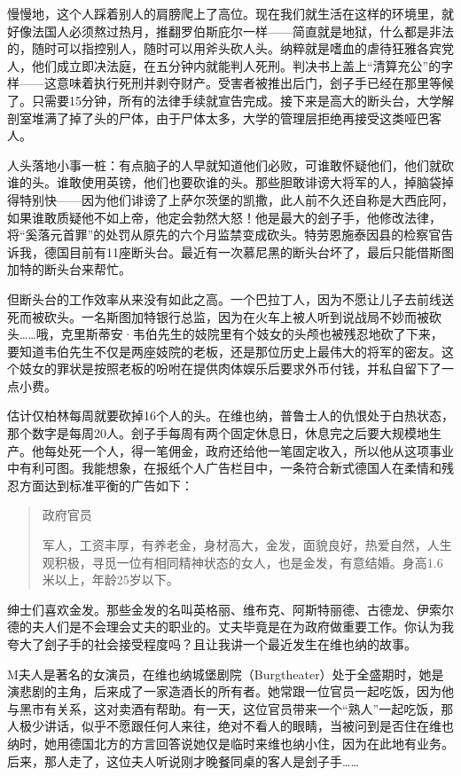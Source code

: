 \documentclass[UTF8]{ctexart}
\begin{document}
慢慢地，这个人踩着别人的肩膀爬上了高位。现在我们就生活在这样的环境里，就好像法国人必须熬过热月，推翻罗伯斯庇尔一样——简直就是地狱，什么都是非法的，随时可以指控别人，随时可以用斧头砍人头。纳粹就是嗜血的虐待狂雅各宾党人，他们成立即决法庭，在五分钟内就能判人死刑。判决书上盖上“清算充公”的字样——这意味着执行死刑并剥夺财产。受害者被推出后门，刽子手已经在那里等候了。只需要15分钟，所有的法律手续就宣告完成。接下来是高大的断头台，大学解剖室堆满了掉了头的尸体，由于尸体太多，大学的管理层拒绝再接受这类哑巴客人。

人头落地小事一桩：有点脑子的人早就知道他们必败，可谁敢怀疑他们，他们就砍谁的头。谁敢使用英镑，他们也要砍谁的头。那些胆敢诽谤大将军的人，掉脑袋掉得特别快——因为他们诽谤了上萨尔茨堡的凯撒，此人前不久还自称是大西庇阿，如果谁敢质疑他不如上帝，他定会勃然大怒！他是最大的刽子手，他修改法律，将“奚落元首罪”的处罚从原先的六个月监禁变成砍头。特劳恩施泰因县的检察官告诉我，德国目前有11座断头台。最近有一次慕尼黑的断头台坏了，最后只能借斯图加特的断头台来帮忙。

但断头台的工作效率从来没有如此之高。一个巴拉丁人，因为不愿让儿子去前线送死而被砍头。一名斯图加特银行总监，因为在火车上被人听到说战局不妙而被砍头……哦，克里斯蒂安·韦伯先生的妓院里有个妓女的头颅也被残忍地砍了下来，要知道韦伯先生不仅是两座妓院的老板，还是那位历史上最伟大的将军的密友。这个妓女的罪状是按照老板的吩咐在提供肉体娱乐后要求外币付钱，并私自留下了一点小费。

估计仅柏林每周就要砍掉16个人的头。在维也纳，普鲁士人的仇恨处于白热状态，那个数字是每周20人。刽子手每周有两个固定休息日，休息完之后要大规模地生产。他每处死一个人，得一笔佣金，政府还给他一笔固定收入，所以他从这项事业中有利可图。我能想象，在报纸个人广告栏目中，一条符合新式德国人在柔情和残忍方面达到标准平衡的广告如下：

\begin{quote}
政府官员

军人，工资丰厚，有养老金，身材高大，金发，面貌良好，热爱自然，人生观积极，寻觅一位有相同精神状态的女人，也是金发，有意结婚。身高1.6米以上，年龄25岁以下。
\end{quote}

绅士们喜欢金发。那些金发的名叫英格丽、维布克、阿斯特丽德、古德龙、伊索尔德的夫人们是不会理会丈夫的职业的。丈夫毕竟是在为政府做重要工作。你认为我夸大了刽子手的社会接受程度吗？且让我讲一个最近发生在维也纳的故事。

M夫人是著名的女演员，在维也纳城堡剧院（Burgtheater）处于全盛期时，她是演悲剧的主角，后来成了一家造酒长的所有者。她常跟一位官员一起吃饭，因为他与黑市有关系，这对卖酒有帮助。有一天，这位官员带来一个“熟人”一起吃饭，那人极少讲话，似乎不愿跟任何人来往，绝对不看人的眼睛，当被问到是否住在维也纳时，她用德国北方的方言回答说她仅是临时来维也纳小住，因为在此地有业务。后来，那人走了，这位夫人听说刚才晚餐同桌的客人是刽子手……
\end{document}
